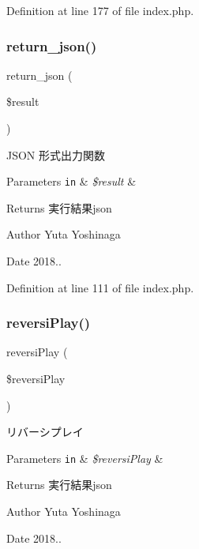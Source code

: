 Definition at line 177 of file index.\+php.

\mbox{\label{index_8php_aea83396ad3849fe862e4de15675a0581}} 
\subsubsection{\texorpdfstring{return\+\_\+json()}{return\_json()}}
{\footnotesize\ttfamily return\+\_\+json (\begin{DoxyParamCaption}\item[{}]{\$result }\end{DoxyParamCaption})}



J\+S\+ON 形式出力関数 


\begin{DoxyParams}[1]{Parameters}
\mbox{\tt in}  & {\em \$result} & \\
\hline
\end{DoxyParams}
\begin{DoxyReturn}{Returns}
実行結果json 
\end{DoxyReturn}
\begin{DoxyAuthor}{Author}
Yuta Yoshinaga 
\end{DoxyAuthor}
\begin{DoxyDate}{Date}
2018.. 
\end{DoxyDate}


Definition at line 111 of file index.\+php.

\mbox{\label{index_8php_a81e6891a5c38d4d0dedd74382f3e9353}} 
\subsubsection{\texorpdfstring{reversi\+Play()}{reversiPlay()}}
{\footnotesize\ttfamily reversi\+Play (\begin{DoxyParamCaption}\item[{}]{\$reversi\+Play }\end{DoxyParamCaption})}



リバーシプレイ 


\begin{DoxyParams}[1]{Parameters}
\mbox{\tt in}  & {\em \$reversi\+Play} & \\
\hline
\end{DoxyParams}
\begin{DoxyReturn}{Returns}
実行結果json 
\end{DoxyReturn}
\begin{DoxyAuthor}{Author}
Yuta Yoshinaga 
\end{DoxyAuthor}
\begin{DoxyDate}{Date}
2018.. 
\end{DoxyDate}


